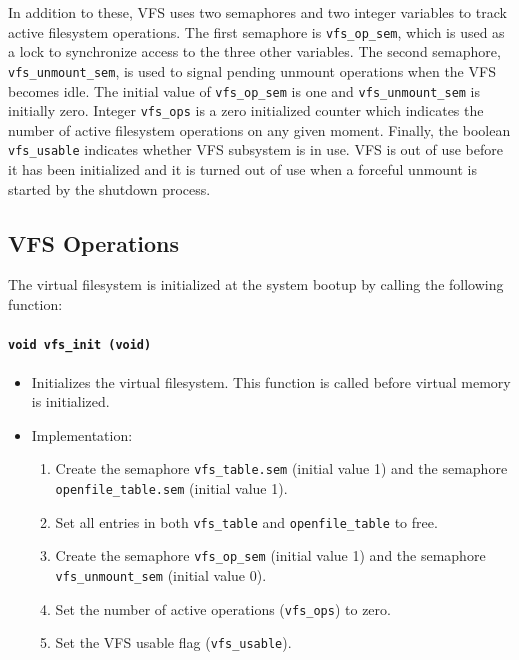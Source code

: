 \documentclass[twoside,a4paper]{report}
\makeatletter
\newenvironment{function}[3]{%
\paragraph{\texttt{#1 {\textbf{#2}} (#3)}}%
\index{#2@\texttt{#2}}%
\begin{itemize}%
}{%
\end{itemize}%
}
\makeatother
\begin{document}
In addition to these, VFS uses two semaphores and two integer
variables to track active filesystem operations. The first semaphore
is \texttt{vfs\_op\_sem},
which is used as a lock to synchronize access to the three other
variables. The second semaphore,
\texttt{vfs\_unmount\_sem},
is used to signal pending unmount operations when the VFS becomes
idle. The initial value of \texttt{vfs\_op\_sem} is one and
\texttt{vfs\_unmount\_sem} is initially zero. Integer \texttt{vfs\_ops}
 is a zero initialized counter which
indicates the number of active filesystem operations on any given
moment. Finally, the boolean \texttt{vfs\_usable}
 indicates whether VFS
subsystem is in use. VFS is out of use before it has been initialized
and it is turned out of use when a forceful unmount is started by the
shutdown process.

\subsection{VFS Operations}


The virtual filesystem is initialized at the system bootup by calling
the following function:

\begin{function}{void}{vfs\_init}{void}

\item Initializes the virtual filesystem. This function is called
before virtual memory is initialized.

\item Implementation:
\begin{enumerate}

\item Create the semaphore \texttt{vfs\_table.sem} (initial value 1) and
the semaphore \texttt{openfile\_table.sem} (initial value 1).

\item Set all entries in both \texttt{vfs\_table} and
\texttt{openfile\_table} to free.

\item Create the semaphore \texttt{vfs\_op\_sem} (initial value 1) and
the semaphore \texttt{vfs\_unmount\_sem} (initial value 0).

\item Set the number of active operations (\texttt{vfs\_ops}) to zero.

\item Set the VFS usable flag (\texttt{vfs\_usable}).

\end{enumerate}
\end{function}
\end{document}
